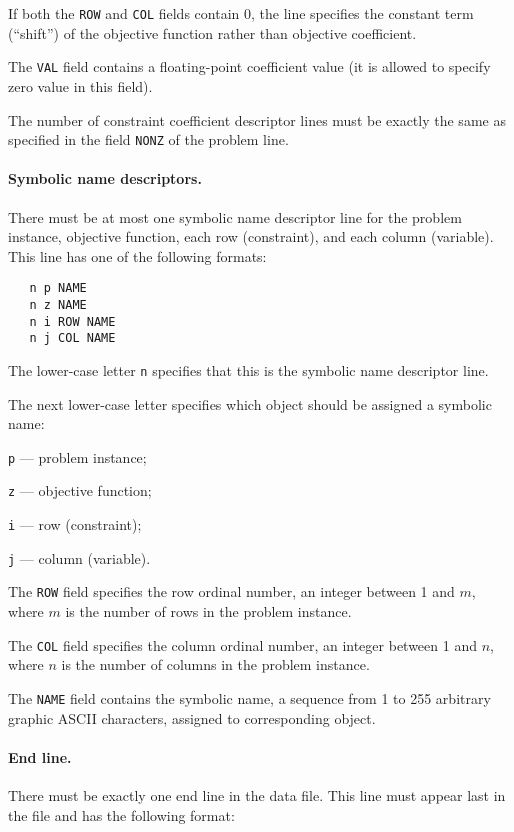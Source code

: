 If both the \verb|ROW| and \verb|COL| fields contain 0, the line
specifies the constant term (``shift'') of the objective function
rather than objective coefficient.

The \verb|VAL| field contains a floating-point coefficient value (it is
allowed to specify zero value in this field).

The number of constraint coefficient descriptor lines must be exactly
the same as specified in the field \verb|NONZ| of the problem line.

\paragraph{Symbolic name descriptors.} There must be at most one
symbolic name descriptor line for the problem instance, objective
function, each row (constraint), and each column (variable). This line
has one of the following formats:

\begin{verbatim}
   n p NAME
   n z NAME
   n i ROW NAME
   n j COL NAME
\end{verbatim}

The lower-case letter \verb|n| specifies that this is the symbolic name
descriptor line.

The next lower-case letter specifies which object should be assigned a
symbolic name:

\verb|p| --- problem instance;

\verb|z| --- objective function;

\verb|i| --- row (constraint);

\verb|j| --- column (variable).

The \verb|ROW| field specifies the row ordinal number, an integer
between 1 and $m$, where $m$ is the number of rows in the problem
instance.

The \verb|COL| field specifies the column ordinal number, an integer
between 1 and $n$, where $n$ is the number of columns in the problem
instance.

The \verb|NAME| field contains the symbolic name, a sequence from 1 to
255 arbitrary graphic ASCII characters, assigned to corresponding
object.

\paragraph{End line.} There must be exactly one end line in the data
file. This line must appear last in the file and has the following
format:

